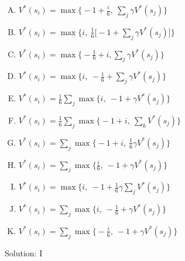 \documentclass[11pt, answers]{exam}
\begin{document}
\begin{questions}
\begin{parts}
\begin{enumerate}[A.]
	\item $V^*(s_i) = \max \Big\{ -1+\displaystyle\frac{i}{6},\ \sum_j \gamma V^*(s_j) \Big\}$
	\item $V^*(s_i) = \max \Big\{ i,\ \displaystyle\frac{1}{6}\big[-1+\sum_j \gamma V^*(s_j) \big] \Big\}$
	\item $V^*(s_i) = \max \Big\{ -\displaystyle\frac{1}{6}+i, \sum_j \gamma V^*(s_j) \Big\}$
	\item $V^*(s_i) = \max \Big\{ i,\ -\displaystyle\frac{1}{6} + \sum_j \gamma V^*(s_j) \Big\}$
	\item $V^*(s_i) = \displaystyle\frac{1}{6}  \sum_j \max \big\{ i,\ -1+\gamma V^*(s_j) \big\}$
	\item $V^*(s_i) = \displaystyle\frac{1}{6}  \sum_j \max \big\{-1+ i,\ \sum_k V^*(s_j) \big\}$
	\item $V^*(s_i) = \displaystyle\sum_j \max \Big\{-1+ i,\ \displaystyle\frac{1}{6} \gamma V^*(s_j) \Big\}$
	\item $V^*(s_i) = \displaystyle\sum_j \max \Big\{\displaystyle\frac{i}{6},\ -1+\gamma V^*(s_j) \Big\}$
	\item $V^*(s_i) = \max \Big\{i,\ -1+\displaystyle\frac{1}{6}\gamma \sum_j V^*(s_j) \Big\}$
	\item $V^*(s_i) = \displaystyle\sum_j \max \Big\{i,\ -\displaystyle\frac{1}{6}+\gamma V^*(s_j) \Big\}$
	\item $V^*(s_i) = \displaystyle\sum_j \max \Big\{-\displaystyle\frac{i}{6},\ -1+\gamma V^*(s_j) \Big\}$
\end{enumerate}
Solution: I

\end{parts}
\end{questions}
\end{document}
